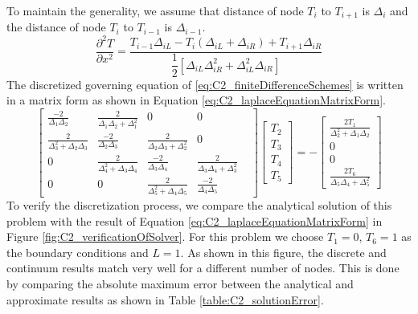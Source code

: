 To maintain the generality, we assume that distance of node $T_i$ to $T_{i+1}$ is $\Delta_i$ and the distance of node $T_i$ to $T_{i-1}$ is $\Delta_{i-1}$.
%
\begin{equation}\label{eq:C2_finiteDifferenceSchemes}
    \frac{\partial^2 T}{\partial x^2} = 
    \frac{T_{i-1} \Delta_{iL} - 
          T_{i} (\Delta_{iL} + \Delta_{iR}) + 
          T_{i+1} \Delta_{iR}}
         {\dfrac{1}{2} \left[ \Delta_{iL} \Delta_{iR}^2 + 
                             \Delta_{iL}^2 \Delta_{iR} \right]}
\end{equation}
%
The discretized governing equation of \eqref{eq:C2_finiteDifferenceSchemes} is written in a matrix form as shown in Equation \eqref{eq:C2_laplaceEquationMatrixForm}.
%
\begin{equation}\label{eq:C2_laplaceEquationMatrixForm}
    \begin{bmatrix}
        \frac{-2}{\Delta_{1} \Delta_{2}} &
        \frac{2}{\Delta_{1} \Delta_{2} + \Delta_{1}^2} &
        0 &
        0 &
        \\
        \frac{2}{\Delta_{3}^2 + \Delta_{2} \Delta_{3}} & 
        \frac{-2}{\Delta_{2} \Delta_{3}} &
        \frac{2}{\Delta_{2} \Delta_{3} + \Delta_{2}^2} &
        0
        \\
        0 &
        \frac{2}{\Delta_{4}^2 + \Delta_{3} \Delta_{4}} & 
        \frac{-2}{\Delta_{3} \Delta_{4}} &
        \frac{2}{\Delta_{3} \Delta_{4} + \Delta_{3}^2} &
        \\
        0 &
        0 &
        \frac{2}{\Delta_{5}^2 + \Delta_{4} \Delta_{5}} & 
        \frac{-2}{\Delta_{4} \Delta_{5}}
    \end{bmatrix}
    \begin{bmatrix}
        T_2 \\
        T_3 \\
        T_4 \\
        T_5
    \end{bmatrix}
    =
    -\begin{bmatrix}
         \frac{2T_1}{\Delta_{2}^2 + \Delta_{1} \Delta_{2}} \\
         0 \\
        0 \\
        \frac{2T_6}{\Delta_{5} \Delta_{4} + \Delta_{5}^2}
    \end{bmatrix}
\end{equation}
%
To verify the discretization process, we compare the analytical solution of this problem with the result of Equation \eqref{eq:C2_laplaceEquationMatrixForm} in Figure \ref{fig:C2_verificationOfSolver}. For this problem we choose $T_1 = 0$, $T_6 = 1$ as the boundary conditions and $L = 1$.  As shown in this figure, the discrete and continuum results match very well for a different number of nodes. This is done by comparing the absolute maximum error between the analytical and approximate results as shown in Table \ref{table:C2_solutionError}.
